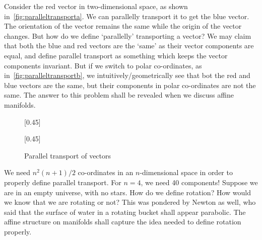 \documentclass[a4paper, 11pt]{book}
\theoremstyle{definition}
\begin{document}
    Consider the red vector in two-dimensional space, as shown in~\cref{fig:paralleltransporta}. We can parallelly transport it to get the blue vector. The orientation of the vector remains the same while the origin of the vector changes. But how do we define `parallelly' transporting a vector? We may claim that both the blue and red vectors are the `same' as their vector components are equal, and define parallel transport as something which keeps the vector components invariant. But if we switch to polar co-ordinates, as in~\cref{fig:paralleltransportb}, we intuitively/geometrically see that bot the red and blue vectors are the same, but their components in polar co-ordinates are not the same. The answer to this problem shall be revealed when we discuss affine manifolds.
    \begin{figure}[htb]
        \centering
        [0.45\textwidth]
        {
        }
        \hfill
        [0.45\textwidth]
        {
        }
        \caption{Parallel transport of vectors}
        \label{fig:paralleltransport}
    \end{figure}
    We need \(n^2(n+1)/2\) co-ordinates in an \(n\)-dimensional space in order to properly define parallel transport. For \(n = 4\), we need 40 components! Suppose we are in an empty universe, with no stars. How do we define rotation? How would we know that we are rotating or not? This was pondered by Newton as well, who said that  the surface of water in a rotating bucket shall appear parabolic. The affine structure on manifolds shall capture the idea needed to define rotation properly.
\end{document}
